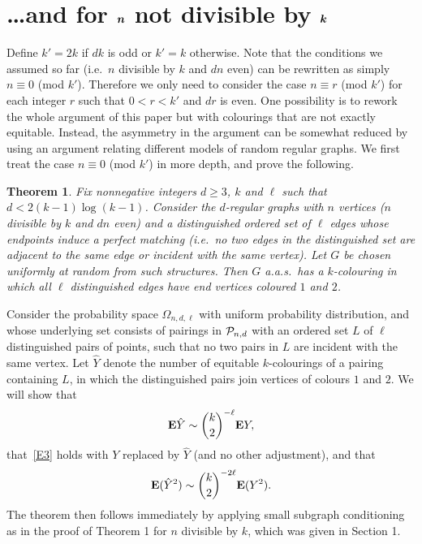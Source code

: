 \documentclass[12pt]{article}
\newcommand{\lab}[1]{\label{#1}}
\newtheorem{thm}{Theorem}
\def\proof{\par\noindent{\bf Proof.\enspace}\rm}
\def\P{{\cal P}}
\def\ex{{\bf E}}
\def\Pnd{\P_{n,d}}
\def\be{\begin{equation}}
\def\ee{\end{equation}}
\newcommand{\bel}[1]{\be\lab{#1}}
\newcommand{\mbf}[1] {\text{\boldmath$#1$}}
\begin{document}
\section{\ldots and for $\mbf n$ not divisible by $\mbf k$}
\label{sec:general_n}
%
Define $k'=2k$ if $dk$ is odd or $k'=k$ otherwise. Note that the conditions we assumed so far (i.e.~$n$ divisible by $k$ and $dn$ even) can be rewritten as simply $n\equiv 0$ (mod $k'$). Therefore we only need to consider the case $n\equiv r$ (mod $k'$) for each integer $r$ such that $0<r<k'$ and $dr$ is even.
One possibility is to rework the whole argument of this paper but with colourings that are not exactly equitable. Instead, the asymmetry in the argument can be somewhat reduced by using an argument relating different models of random regular graphs. We first treat the case $n\equiv 0$ (mod $k'$) in more depth, and prove the following.
%
\begin{thm}
\lab{TMAIN2}
Fix nonnegative integers $d\ge3$, $k$ and $\ell$ such that $d<2(k-1)\log(k-1)$. Consider the $d$-regular graphs with $n$ vertices ($n$ divisible by $k$ and $dn$ even) and a distinguished ordered set of $\ell$ edges whose endpoints induce a perfect matching (i.e.~no two edges in the distinguished set are adjacent to the same edge or incident with the same vertex). Let $G$ be chosen uniformly at   random from such structures. Then $G$ a.a.s.\ has a $k$-colouring in which all $\ell$ distinguished edges have end vertices coloured $1$ and $2$.
\end{thm}
%
\proof
Consider the probability space $\Omega_{n,d,\ell}$ with uniform probability distribution, and whose underlying set consists of pairings in $\Pnd$ with an ordered set $L$ of $\ell$ distinguished pairs of points, such that no two pairs in $L$ are incident with the same vertex. Let $\hat Y$ denote the  number of equitable $k$-colourings of a pairing containing $L$, in which the distinguished pairs join vertices of colours $1$ and $2$. We will show that
\bel{yhat}
\ex \hat Y \sim \binom{k}{2}^{-\ell}\ex Y,
\ee
that~\eqref{E3} holds with $Y$ replaced by $\hat Y$ (and no other adjustment), and that
\bel{yhatsq}
\ex (\hat Y^2) \sim \binom{k}{2}^{-2\ell}\ex (Y^2).
\ee
The theorem  then follows immediately by applying small subgraph conditioning as in the proof of Theorem 1 for $n$ divisible by $k$, which was given in Section 1. 
\end{document}
